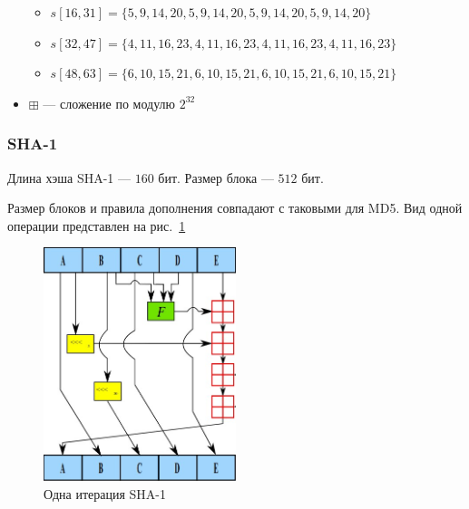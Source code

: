 \documentclass[a4paper, 14pt]{extarticle}
\begin{document}
\begin{itemize}
\begin{itemize}
        \item $s[16, 31] = \{ 5,  9, 14, 20,  5,  9, 14, 20,  5,  9, 14, 20,  5,  9, 14, 20 \}$
        \item $s[32, 47] = \{ 4, 11, 16, 23,  4, 11, 16, 23,  4, 11, 16, 23,  4, 11, 16, 23 \} $
        \item $s[48, 63] = \{ 6, 10, 15, 21,  6, 10, 15, 21,  6, 10, 15, 21,  6, 10, 15, 21 \}$
    \end{itemize}
    \item $\boxplus$ --- сложение по модулю $2^{32}$\\
\end{itemize}

\subsubsection{SHA-1}
Длина хэша SHA-1 --- $160$ бит. Размер блока --- $512$ бит.

Размер блоков и правила дополнения совпадают с таковыми для MD5. Вид одной операции представлен на рис.~\ref{img:sha1}
\begin{figure}[h]
    \centering
    \includegraphics[width=0.5\textwidth]{img/S002.jpg}
    \caption{Одна итерация SHA-1}%
    \label{img:sha1}
\end{figure}

\FloatBarrier{}
\end{document}
